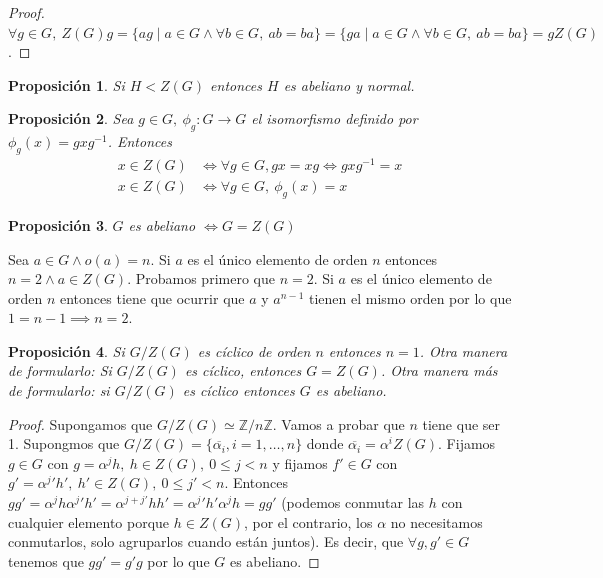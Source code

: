 \documentclass{book}
\newtheorem{pro}{Proposición}
\theoremstyle{definition}
\theoremstyle{remark}
\newcommand{\inv}[1]{#1^{-1}}
\newcommand{\isom}{\simeq}
\newcommand{\ZnZ}{\mathbb{Z}/n\mathbb{Z}}
\begin{document}
\begin{proof}
	$\forall g \in G,\ Z(G)g = \{ag \mid a \in G \land \forall b \in G,\ ab = ba\} = \{ga \mid a \in G \land \forall b \in G,\ ab = ba\} = gZ(G)$.
\end{proof}

\begin{pro}
	Si $H < Z(G)$ entonces $H$ es abeliano y normal.
\end{pro}

\begin{pro}
	Sea $g \in G,\ \phi_g: G \to G$ el isomorfismo definido por $\phi_g(x) = gx\inv{g}$. Entonces
	\begin{align*}
		x \in Z(G) &\iff \forall g \in G, gx = xg \iff gx\inv{g} = x \\
		x \in Z(G) &\iff \forall g \in G,\ \phi_g(x) = x 
	\end{align*}
\end{pro}

\begin{pro}
	$G$ es abeliano $\iff G = Z(G)$
\end{pro}

Sea $a \in G \land o(a) = n$. Si $a$ es el único elemento de orden $n$ entonces $n = 2 \land a \in Z(G)$. Probamos primero que $n=2$. Si $a$ es el único elemento de orden $n$ entonces tiene que ocurrir que $a$ y $a^{n-1}$ tienen el mismo orden por lo que $1 = n-1 \implies n = 2$.

\begin{pro}
	\label{pro:triplecentro}
	Si $G/Z(G)$ es cíclico de orden $n$ entonces $n = 1$. Otra manera de formularlo: Si $G/Z(G)$ es cíclico, entonces $G = Z(G)$. Otra manera más de formularlo: si $G/Z(G)$ es cíclico entonces $G$ es abeliano.
\end{pro}

\begin{proof}
	Supongamos que $G/Z(G) \isom \ZnZ$. Vamos a probar que $n$ tiene que ser 1. Supongmos que $G/Z(G) = \{\overline{\alpha_i}, i = 1, \dots, n\}$ donde $\overline{\alpha_i} = \alpha^i Z(G)$. Fijamos $g \in G$ con $g = \alpha^j h,\ h \in Z(G),\ 0 \leq j < n$ y fijamos $f' \in G$ con $g' = {\alpha^j}' h',\ h' \in Z(G),\ 0 \leq j' < n$. Entonces $gg' = \alpha^j h{\alpha^j}' h' = \alpha^{j+j'}hh' = {\alpha^j}' h' \alpha^j h = gg'$ (podemos conmutar las $h$ con cualquier elemento porque $h \in Z(G)$, por el contrario, los $\alpha$ no necesitamos conmutarlos, solo agruparlos cuando están juntos). Es decir, que $\forall g, g' \in G$ tenemos que $gg' = g'g$ por lo que $G$ es abeliano.
\end{proof}
\end{document}
